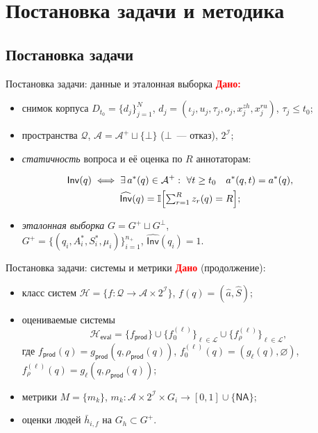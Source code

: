 \documentclass[t]{beamer}
\newcommand{\key}[1]{\textcolor{red}{\textbf{#1}}}  %
\let\mathrm\mathsf  %
\newcommand{\I}{\mathbb{I}}
\newcommand{\Inv}{\mathrm{Inv}}
\newcommand{\Heval}{\mathcal{H}_{\mathrm{eval}}}
\newcommand{\Lm}{\mathcal{L}}
\newcommand{\fprod}{f_{\mathrm{prod}}}
\newcommand{\gprod}{g_{\mathrm{prod}}}
\newcommand{\rprod}{\rho_{\mathrm{prod}}}
\newcommand{\refuse}{\bot}
\newcommand{\NA}{\mathrm{NA}}
\begin{document}
\section{Постановка задачи и методика}
\subsection{Постановка задачи}

\begin{frame}{Постановка задачи: данные и эталонная выборка}
    \key{Дано:}
    \begin{itemize}
        \item снимок корпуса $D_{t_0}=\{d_j\}_{j=1}^N$, $d_j=(\iota_j,u_j,\tau_j,o_j,x_j^{zh},x_j^{ru})$, $\tau_j\le t_0$;
        \item пространства $\mathcal{Q}$, $\mathcal{A}=\mathcal{A}^+\sqcup\{\refuse\}$ ($\refuse$~--- отказ), $2^{\mathcal{I}}$;
        \item \emph{статичность} вопроса и её оценка по $R$ аннотаторам:
    \end{itemize}
    \begin{gather*}
        \Inv(q)\iff\exists\,a^*(q)\in\mathcal{A}^+:\ \forall t\ge t_0\quad a^*(q,t)=a^*(q),\\
        \widehat{\Inv}(q)=\I\Bigl[\textstyle\sum_{r=1}^{R} z_r(q)=R\Bigr];
    \end{gather*}
    \begin{itemize}
        \item \emph{эталонная выборка} $G=G^+\sqcup G^{\refuse}$,\\
            $G^+=\{(q_i,A^*_i,S^*_i,\mu_i)\}_{i=1}^{n_+}$, $\widehat{\Inv}(q_i)=1$.
    \end{itemize}
\end{frame}

\begin{frame}{Постановка задачи: системы и метрики}
    \key{Дано} (продолжение):
    \begin{itemize}
        \item класс систем $\mathcal{H}=\{f:\mathcal{Q}\to\mathcal{A}\times2^{\mathcal{I}}\}$, $f(q)=(\hat a,\hat S)$;
        \item оцениваемые системы
            \[
                \Heval=\{\fprod\}\cup\{f_0^{(\ell)}\}_{\ell\in\Lm}\cup\{f_\rho^{(\ell)}\}_{\ell\in\Lm},
            \]
            где $\fprod(q)=\gprod(q,\rprod(q))$, $f_0^{(\ell)}(q)=(g_\ell(q),\varnothing)$,\\
            $f_\rho^{(\ell)}(q)=g_\ell(q,\rprod(q))$;
        \item метрики $M=\{m_k\}$, $m_k:\mathcal{A}\times2^{\mathcal{I}}\times G_i\to[0,1]\cup\{\NA\}$;
        \item оценки людей $\bar h_{i,f}$ на $G_h\subset G^+$.
    \end{itemize}
\end{frame}
\end{document}
